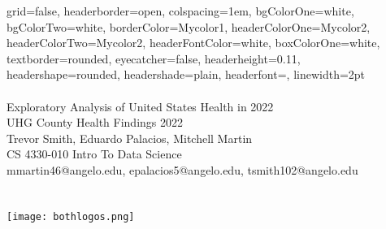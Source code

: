 \documentclass[a0paper, twocolumn, landscape]{baposter}
\begin{document}

\begin{poster}
{
grid=false,
headerborder=open, %
colspacing=1em, %
bgColorOne=white, %
bgColorTwo=white, %
borderColor=Mycolor1, %
headerColorOne=Mycolor2, %
headerColorTwo=Mycolor2, %
headerFontColor=white, %
boxColorOne=white, %
textborder=rounded, %
eyecatcher=false, %
headerheight=0.11\textheight, %
headershape=rounded, %
headershade=plain,
headerfont=\Large\textsf, %
linewidth=2pt %
}
{}
%
%
{
\textsf %
{
\vspace{2.5em}\\
\\
{Exploratory Analysis of United States Health in 2022}
}
} %
{\sf\vspace{0.2em}\\
UHG County Health Findings 2022\\
\small { Trevor Smith, Eduardo Palacios, Mitchell Martin  }%
\vspace{0.1em}\\
\small{ CS 4330-010 Intro To Data Science
\vspace{0.2em}\\
mmartin46@angelo.edu, epalacios5@angelo.edu, tsmith102@angelo.edu  %
\vspace{1.9em}\\
\\
\\
}
}
{\texttt{[image: bothlogos.png]}} 


\end{poster}
\end{document}
